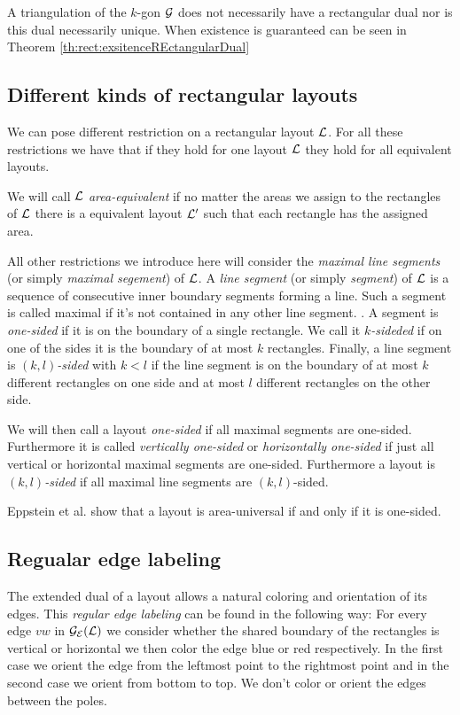   A triangulation of the $k$-gon $\mathcal{G}$ does not necessarily have a rectangular dual nor is this dual necessarily unique. When existence is guaranteed can be seen in Theorem \ref{th:rect:exsitenceREctangularDual}

\subsection{Different kinds of rectangular layouts}
  We can pose different restriction on a rectangular layout $\mathcal{L}$. For all these restrictions we have that if they hold for one layout $\mathcal{L}$ they hold for all equivalent layouts.

  We will call $\mathcal{L}$ \emph{area-equivalent} if no matter the areas we assign to the rectangles of $\mathcal{L}$ there is a equivalent layout $\mathcal{L}'$ such that each rectangle has the assigned area.

  All other restrictions we introduce here will consider the \emph{maximal line segments} (or simply \emph{maximal segement}) of $\mathcal{L}$. A \emph{line segment} (or simply \emph{segment}) of $\mathcal{L}$ is a sequence of consecutive inner boundary segments forming a line. Such a segment is called maximal if it's not contained in any other line segment. . A segment is \emph{one-sided} if it is on the boundary of a single rectangle. We call it \emph{$k$-sideded} if on one of the sides it is the boundary of at most $k$ rectangles. Finally, a line segment is \emph{$(k,l)$-sided} with $k<l$ if the line segment is on the boundary of at most $k$ different rectangles on one side and at most $l$ different rectangles on the other side.

  We will then call a layout \emph{one-sided} if all maximal segments are one-sided. Furthermore it is called \emph{vertically one-sided} or \emph{horizontally one-sided} if just all vertical or horizontal maximal segments are one-sided. Furthermore a layout is \emph{$(k,l)$-sided} if all maximal line segments are $(k,l)$-sided.

  Eppstein et al. \cite{Eppstein2012} show that a layout is area-universal if and only if it is one-sided.

\subsection{Regualar edge labeling}
  The extended dual of a layout allows a natural coloring and orientation of its edges. This \emph{regular edge labeling} can be found in the following way:
  For every edge $vw$ in $\mathcal{G}_{\mathcal{E}}(\mathcal{L})$ we consider whether the shared boundary of the rectangles is vertical or horizontal we then color the edge blue or red respectively. In the first case we orient the edge from the  leftmost point to the rightmost point and in the second case we orient from bottom to top. We don't color or orient the edges between the poles.


